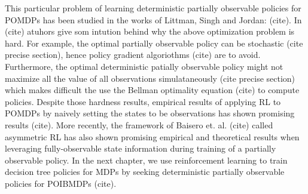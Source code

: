 This particular problem of learning deterministic partially observable policies for POMDPs has been studied in the works of Littman, Singh and Jordan: (cite).
In (cite) atuhors give som intution behind why the above optimization problem is hard. For example, the optimal partially observable policy can be stochastic (cite precise section), hence policy gradient algoriothms (cite) are to avoid. 
Furthermore, the optimal deterministic patially observable policy might not maximize all the value of all observations simulataneously (cite precise section) which makes difficult the use the Bellman optimality equation (cite) to compute policies.
Despite those hardness results, empirical results of applying RL to POMDPs by naively setting the states to be observations has shown promising results (cite). 
More recently, the framework of Baisero et. al. (cite) called asymmetric RL has also shown promising empirical and theoretical results when leveraging fully-observable state information during training of a partially observable policy.
In the next chapter, we use reinforcement learning to train decision tree policies for MDPs by seeking deterministic partially observable policies for POIBMDPs (cite).  
